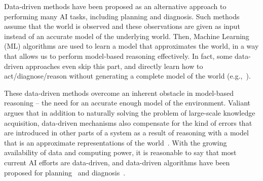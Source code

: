\documentclass[12pt]{article}
\begin{document}



Data-driven methods have been proposed as an alternative approach to performing many AI tasks, including planning and diagnosis. 
Such methods assume that the world is observed and these observations are given as input instead of an accurate model of the underlying world. Then, Machine Learning (ML) algorithms are used to learn a model that approximates the world,   
in a way that allows us to perform model-based reasoning effectively. In fact, some data-driven approaches even skip this part, and directly learn how to act/diagnose/reason without generating a complete model of the world (e.g.,~\cite{kearns2002POMDPsample}). 


These data-driven methods overcome an inherent obstacle in model-based reasoning -- the need for an accurate enough model of the environment. Valiant
argues that in addition to naturally solving the problem of large-scale knowledge acquisition, data-driven mechanisms also compensate for the kind of errors that 
are introduced in other parts of a system as a result of  reasoning with a model that is an approximate representations of the world~\cite{valiant2000neuroidal,valiant2000robustLogics}. With the growing availability of data and computing power, it is reasonable to say that most current AI efforts are data-driven,
and data-driven algorithms have been proposed for  planning~\cite{fern2011first,juba2016jmlr} and diagnosis~\cite{keren2011model,qin2012survey}.
\end{document}

